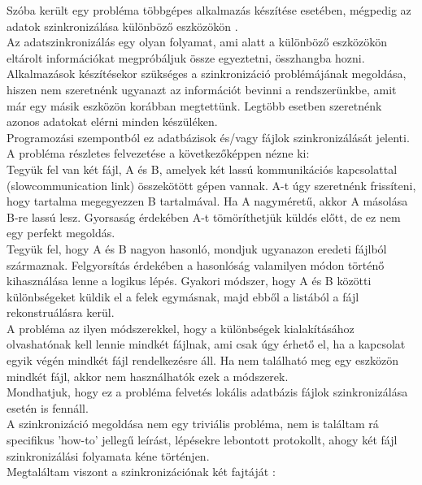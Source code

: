 Szóba került egy probléma többgépes alkalmazás készítése esetében, mégpedig az adatok szinkronizálása különböző eszközökön \cite{nakatani2006data}.
\vspace{5pt} \\ Az adatszinkronizálás egy olyan folyamat, ami alatt a különböző eszközökön eltárolt információkat megpróbáljuk össze egyeztetni, összhangba hozni.
\vspace{5pt} \\Alkalmazások készítésekor szükséges a szinkronizáció problémájának megoldása, hiszen nem szeretnénk ugyanazt az információt bevinni a rendszerünkbe, amit már egy másik eszközön korábban megtettünk. Legtöbb esetben szeretnénk azonos adatokat elérni minden készüléken.
\vspace{5pt} \\Programozási szempontból ez adatbázisok és/vagy fájlok szinkronizálását jelenti.
\vspace{15pt} \\ A probléma részletes felvezetése a következőképpen nézne ki:
\vspace{5pt} \\  Tegyük fel van két fájl, A és B, amelyek két lassú kommunikációs kapcsolattal (slowcommunication link) összekötött gépen vannak. A-t úgy szeretnénk frissíteni, hogy tartalma megegyezzen B tartalmával.  Ha A nagyméretű, akkor A másolása B-re lassú lesz. Gyorsaság érdekében A-t tömöríthetjük küldés előtt, de ez nem egy perfekt megoldás.
\vspace{5pt} \\ Tegyük fel, hogy A és B nagyon hasonló, mondjuk ugyanazon eredeti fájlból származnak. Felgyorsítás érdekében a hasonlóság valamilyen módon történő kihasználása lenne a logikus lépés. Gyakori módszer, hogy A és B közötti különbségeket küldik el a felek egymásnak, majd ebből a listából a fájl rekonstruálásra kerül. 
\vspace{5pt} \\ A probléma az ilyen módszerekkel, hogy a különbségek kialakításához olvashatónak kell lennie mindkét fájlnak, ami csak úgy érhető el, ha a kapcsolat egyik végén mindkét fájl rendelkezésre áll. Ha nem található meg egy eszközön mindkét fájl, akkor nem használhatók ezek a módszerek.
\vspace{5pt} \\ Mondhatjuk, hogy ez a probléma felvetés lokális adatbázis fájlok szinkronizálása esetén is fennáll.
\vspace{15pt} \\ A szinkronizáció megoldása nem egy triviális probléma, nem is találtam rá specifikus 'how-to' jellegű leírást, lépésekre lebontott protokollt, ahogy két fájl szinkronizálási folyamata kéne történjen.
\\ Megtaláltam viszont a szinkronizációnak két fajtáját \cite{balaji2020blog}:

